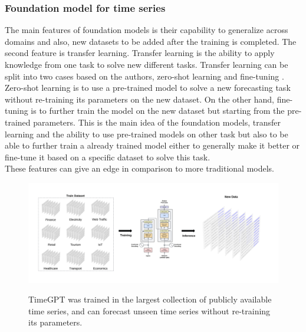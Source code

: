 \documentclass{article}
\begin{document}
\subsubsection{Foundation model for time series}
The main features of foundation models is their capability to generalize across domains and also, new datasets to be added after the training is completed. The second feature is transfer learning. Transfer learning is the ability to apply knowledge from one task to solve new different tasks. Transfer learning can be split into two cases based on the authors, zero-shot learning and fine-tuning \cite{garza2023timegpt1}. Zero-shot learning is to use a pre-trained model to solve a new forecasting task without re-training its parameters on the new dataset. On the other hand, fine-tuning is to further train the model on the new dataset but starting from the pre-trained parameters. This is the main idea of the foundation models, transfer learning and the ability to use pre-trained models on other task but also to be able to further train a already trained model either to generally make it better or fine-tune it based on a specific dataset to solve this task.\\
These features can give an edge in comparison to more traditional models.\\

\begin{figure}[h]
\includegraphics[width=1\linewidth]{images/foundation_model.png}
    \label{fig:mesh1}
    \caption{TimeGPT was trained in the largest collection of publicly available time series, and can
forecast unseen time series without re-training its parameters. \cite{garza2023timegpt1}}
\end{figure}
\\

\newpage
\end{document}
